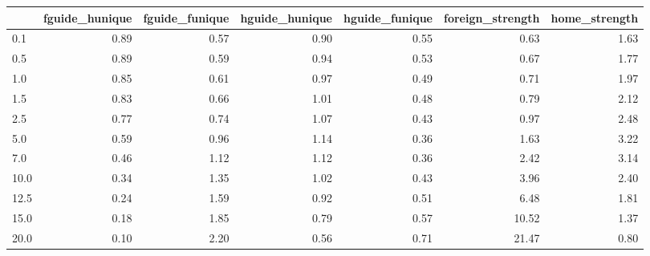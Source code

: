\begin{tabular}{lrrrrrr}
\toprule
 & fguide_hunique & fguide_funique & hguide_hunique & hguide_funique & foreign_strength & home_strength \\
\midrule
0.1 & 0.89 & 0.57 & 0.90 & 0.55 & 0.63 & 1.63 \\
0.5 & 0.89 & 0.59 & 0.94 & 0.53 & 0.67 & 1.77 \\
1.0 & 0.85 & 0.61 & 0.97 & 0.49 & 0.71 & 1.97 \\
1.5 & 0.83 & 0.66 & 1.01 & 0.48 & 0.79 & 2.12 \\
2.5 & 0.77 & 0.74 & 1.07 & 0.43 & 0.97 & 2.48 \\
5.0 & 0.59 & 0.96 & 1.14 & 0.36 & 1.63 & 3.22 \\
7.0 & 0.46 & 1.12 & 1.12 & 0.36 & 2.42 & 3.14 \\
10.0 & 0.34 & 1.35 & 1.02 & 0.43 & 3.96 & 2.40 \\
12.5 & 0.24 & 1.59 & 0.92 & 0.51 & 6.48 & 1.81 \\
15.0 & 0.18 & 1.85 & 0.79 & 0.57 & 10.52 & 1.37 \\
20.0 & 0.10 & 2.20 & 0.56 & 0.71 & 21.47 & 0.80 \\
\bottomrule
\end{tabular}
